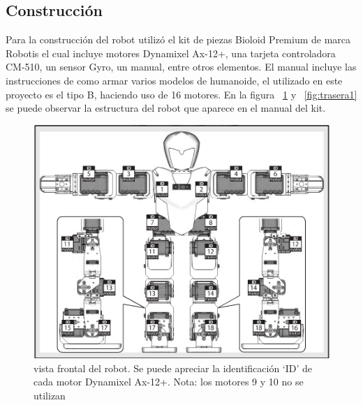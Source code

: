 \subsection{Construcción}
Para la construcción del robot utilizó el kit de piezas Bioloid Premium de marca Robotis el cual incluye motores Dynamixel Ax-12+, una tarjeta controladora CM-510, un sensor Gyro, un manual, entre otros elementos. El manual incluye las instrucciones de como armar varios modelos de humanoide, el utilizado en este proyecto es el tipo B, haciendo uso de 16 motores. En la figura ~\ref{fig:frontal} y ~\ref{fig:trasera1} se puede observar la estructura del robot que aparece en el manual del kit. 

\begin{figure}[hbtp]
\centering
\includegraphics[scale=0.3]{imagenes/Robot.png}
\caption{vista frontal del robot. Se puede apreciar la identificación ‘ID’ de cada motor Dynamixel Ax-12+. Nota: los motores 9 y 10 no se utilizan}
\label{fig:frontal}
\end{figure}

